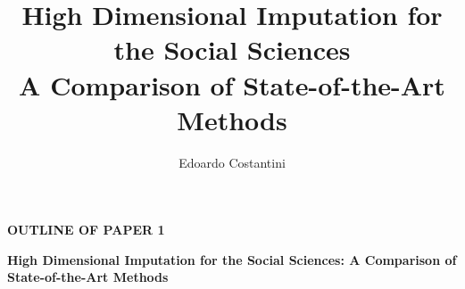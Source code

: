 \documentclass[11pt]{article}
\title{High Dimensional Imputation for the Social Sciences\\ \Large A Comparison of State-of-the-Art Methods}
\author{Edoardo Costantini}
\newcommand{\pathBIB}{../../../statsLib}
\begin{document}

\begin{center}
\textbf{OUTLINE OF PAPER 1}

\textbf{High Dimensional Imputation for the Social Sciences: A Comparison of State-of-the-Art Methods}

\end{center}



\pagebreak

\maketitle



























\pagebreak


\end{document}
